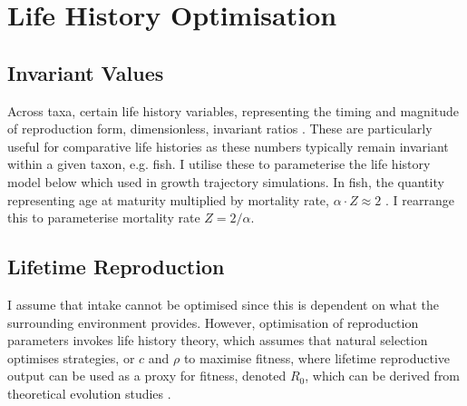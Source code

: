 \documentclass[a4paper]{article} %
\begin{document}
\section{Life History Optimisation}
\subsection{Invariant Values}
Across taxa, certain life history variables, representing the timing and magnitude of reproduction form, dimensionless, invariant ratios \autocite{Charnov1993}. These are particularly useful for comparative life histories as these numbers typically remain invariant within a given taxon, e.g. fish. I utilise these to parameterise the life history model below which used in growth trajectory simulations. In fish, the quantity representing age at maturity multiplied by mortality rate, $\alpha\cdot Z \approx 2$ \autocite{Charnov2001}. I rearrange this to parameterise mortality rate $Z = 2/{\alpha}$.

\subsection{Lifetime Reproduction}
I assume that intake cannot be optimised since this is dependent on what the surrounding environment provides. However, optimisation of reproduction parameters invokes life history theory, which assumes that natural selection optimises strategies, or $c$ and $\rho$ to maximise fitness, where lifetime reproductive output can be used as a proxy for fitness, denoted $R_0$, which can be derived from theoretical evolution studies \autocite{Charnov2001, stearns1992evolution}.
\end{document}
